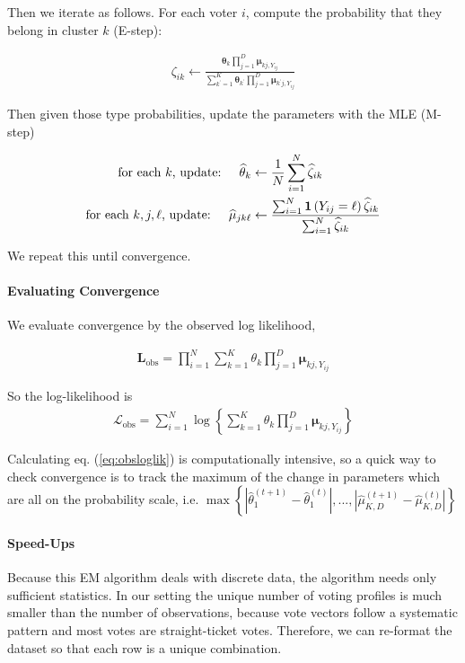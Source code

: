\documentclass[11pt]{article}
\begin{document}
Then we iterate as follows. For each voter \(i\), compute the probability that they belong in cluster \(k\) (E-step):

\begin{align}
\zeta_{ik} \leftarrow \frac{\bm{\theta}_{k}\prod^{D}_{j=1}\bm{\mu}_{kj,Y_{ij}}}
{\sum^{K}_{k^\prime=1}\bm{\theta}_{k^\prime}\prod^{D}_{j=1}\bm{\mu}_{k^\prime j,Y_{ij}}}
\end{align}

Then given those type probabilities, update the parameters with the MLE (M-step)

\begin{align}
\text{for each \(k\), update: }~~~  \widehat{\theta}_{k} &\leftarrow \frac{1}{N}\sum^N_{i = 1}\widehat{\zeta}_{ik} \\
\text{for each \(k, j, \ell\), update: }~~~ \widehat{\mu}_{jk\ell} &\leftarrow\frac{\sum^N_{i=1}\bm{1}\left(Y_{ij} = \ell\right)\widehat{\zeta}_{ik}}{\sum^{N}_{i=1}\widehat{\zeta}_{ik}}
\end{align}

We repeat this until convergence.

\paragraph{Evaluating Convergence} We evaluate convergence by the observed log likelihood, 

\begin{align*}
\mathbf{L}_{\text{obs}} = \prod^N_{i=1}\sum^{K}_{k=1}\theta_k \prod^{D}_{j=1}\bm{\mu}_{kj,Y_{ij}}
\end{align*}

So the log-likelihood is
\begin{align}
\mathcal{L}_{\text{obs}} = \sum^{N}_{i=1}\log \left\{\sum^{K}_{k=1}\theta_k \prod^{D}_{j=1}\bm{\mu}_{kj,Y_{ij}}\right\} \label{eq:obsloglik}
\end{align}

Calculating eq. (\ref{eq:obsloglik}) is computationally intensive, so a quick way to check convergence is to track the maximum of the change in parameters which are all on the probability scale, i.e. \(\max\left\{|\widehat\theta^{(t + 1)}_{1} - \widehat\theta^{(t)}_{1}|, ..., |\widehat\mu^{(t + 1)}_{K,D} - \widehat\mu^{(t)}_{K,D}|\right\}\)

\paragraph{Speed-Ups} Because this EM algorithm deals with discrete data, the algorithm needs only sufficient statistics. In our setting the unique number of voting profiles is much smaller than the number of observations, because vote vectors follow a systematic pattern and most votes are straight-ticket votes. Therefore, we can re-format the dataset so that each row is a unique combination.
\end{document}
